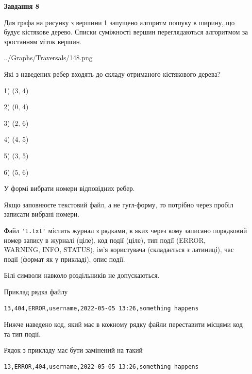 \documentclass[12pt, ukrainian]{article}
\def\code#1{\Verb!#1!}
\begin{document}
{\begin {large}
{\begin {center}\textbf{Завдання 8}\end {center}}\par
Для графа на рисунку з вершини 1 запущено алгоритм пошуку в ширину, що будує кістякове дерево. Списки суміжності вершин переглядаються алгоритмом за зростанням міток вершин.\par
\begin{center}
	{../Graphs/Traversals/148.png}
\end{center}
\par Які з наведених ребер входять до складу отриманого кістякового дерева?\par
1) (3, 4)\par
2) (0, 4)\par
3) (2, 6)\par
4) (4, 5)\par
5) (3, 5)\par
6) (5, 6)\par
{\vskip 15pt} У формі вибрати номери відповідних ребер.


Якщо заповнюєте текстовий файл, а не гугл-форму, то потрібно через пробіл записа\-ти вибрані номери.\par
\newpage


Файл \code{'1.txt'} містить журнал з рядками, в яких через кому записано поряд\-ко\-вий номер запису в журналі (ціле), код події (ціле), тип події (ERROR,\\ WARNING, INFO, STATUS), ім'я користувача (складається з латиниці), час події (фор\-мат як у прикладі), опис події.

Білі символи навколо роздільників не допускаються.

Приклад рядка файлу



\begin{verbatim}
13,404,ERROR,username,2022-05-05 13:26,something happens
\end{verbatim}


Нижче наведено код, який має в кожному рядку файли переставити місцями код та тип події.

Рядок з прикладу має бути замінений на такий



\begin{verbatim}
13,ERROR,404,username,2022-05-05 13:26,something happens
\end{verbatim}





\end{large}}
\end{document}
